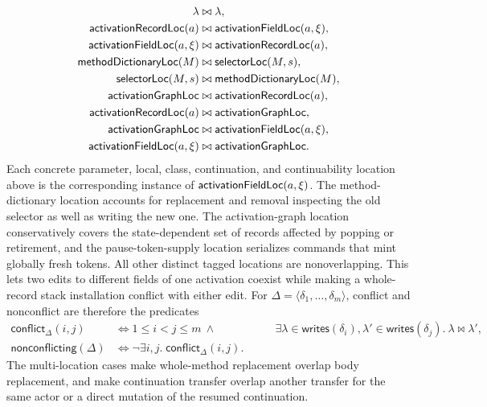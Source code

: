 \begin{equation}\label{eq:reflection-location-overlap}
\begin{aligned}
 \lambda&\mathrel{\bowtie}\lambda,\\
 \mathsf{activationRecordLoc}(a)&\mathrel{\bowtie}
   \mathsf{activationFieldLoc}(a,\xi),\\
 \mathsf{activationFieldLoc}(a,\xi)&\mathrel{\bowtie}
   \mathsf{activationRecordLoc}(a),\\
 \mathsf{methodDictionaryLoc}(M)&\mathrel{\bowtie}
   \mathsf{selectorLoc}(M,s),\\
 \mathsf{selectorLoc}(M,s)&\mathrel{\bowtie}
   \mathsf{methodDictionaryLoc}(M),\\
 \mathsf{activationGraphLoc}&\mathrel{\bowtie}
   \mathsf{activationRecordLoc}(a),\\
 \mathsf{activationRecordLoc}(a)&\mathrel{\bowtie}
   \mathsf{activationGraphLoc},\\
 \mathsf{activationGraphLoc}&\mathrel{\bowtie}
   \mathsf{activationFieldLoc}(a,\xi),\\
 \mathsf{activationFieldLoc}(a,\xi)&\mathrel{\bowtie}
   \mathsf{activationGraphLoc}.
\end{aligned}
\end{equation}
Each concrete parameter, local, class, continuation, and continuability
location above is the corresponding instance of
$\mathsf{activationFieldLoc}(a,\xi)$.  The method-dictionary location accounts
for replacement and removal inspecting the old selector as well as writing
the new one.  The activation-graph location conservatively covers the
state-dependent set of records affected by popping or retirement, and the
pause-token-supply location serializes commands that mint globally fresh
tokens.  All other distinct tagged locations are nonoverlapping.  This lets two edits
to different fields of one activation coexist while making a whole-record
stack installation conflict with either edit.
For $\Delta=\langle\delta_1,\ldots,\delta_m\rangle$, conflict and
nonconflict are therefore the predicates
\begin{equation}\label{eq:reflection-conflict}
\begin{aligned}
 \mathsf{conflict}_{\Delta}(i,j)
  &\Longleftrightarrow 1\le i<j\le m\ \land\
  &\qquad\exists\lambda\in\mathsf{writes}(\delta_i),
          \lambda'\in\mathsf{writes}(\delta_j).
          \ \lambda\mathrel{\bowtie}\lambda',\\
 \mathsf{nonconflicting}(\Delta)
  &\Longleftrightarrow
    \neg\exists i,j.\;\mathsf{conflict}_{\Delta}(i,j).
\end{aligned}
\end{equation}
The multi-location cases make whole-method replacement overlap body
replacement, and make continuation transfer overlap another transfer for the
same actor or a direct mutation of the resumed continuation.

